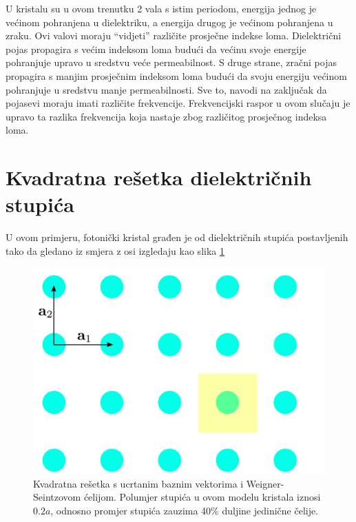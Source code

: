 \documentclass[utf8, seminar]{fer}
\begin{document}
U kristalu su u ovom trenutku 2 vala s istim periodom, energija jednog je
većinom pohranjena u dielektriku, a energija drugog je većinom pohranjena
u zraku. Ovi valovi moraju ``vidjeti'' različite prosječne indekse loma.
Dielektrični pojas propagira s većim indeksom loma budući da većinu svoje energije
pohranjuje upravo u sredstvu veće permeabilnost. S druge strane, zračni pojas
propagira s manjim prosječnim indeksom loma budući da svoju energiju
većinom pohranjuje u sredstvu manje permeabilnosti. Sve to, navodi na zaključak
da pojasevi moraju imati različite frekvencije. Frekvencijski raspor u ovom slučaju
je upravo ta razlika frekvencija koja nastaje zbog različitog prosječnog indeksa loma.

\FloatBarrier


\section{Kvadratna rešetka dielektričnih stupića}

U ovom primjeru, fotonički kristal građen je od dielektričnih stupića
postavljenih tako da gledano iz smjera z osi izgledaju kao slika
\ref{fig:square_lattice}

\begin{figure}[ht]
	\centering
	\includegraphics[width = 1.0\linewidth]{./images/square_lattice.pdf}
	\caption{Kvadratna rešetka s ucrtanim baznim vektorima i Weigner-Seintzovom
	ćelijom. Polumjer stupića u ovom modelu kristala iznosi ${0.2 a}$, odnosno
	promjer stupića zauzima 40\% duljine jedinične čelije.}
	\label{fig:square_lattice}
\end{figure}
\end{document}
